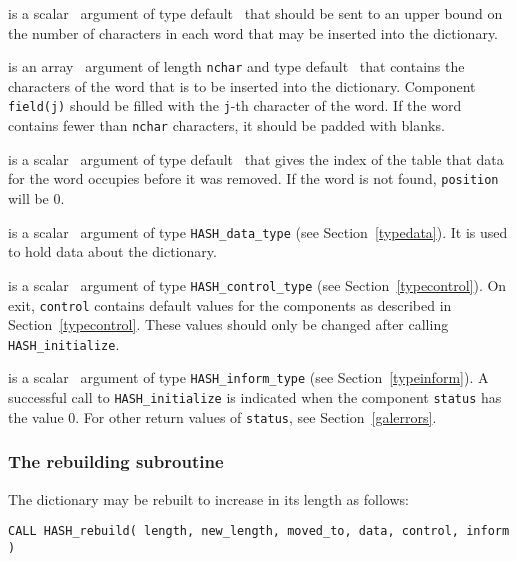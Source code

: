 \documentclass{galahad}
\newcommand{\packagename}{HASH}
\begin{document}
\vspace*{-2mm}
\begin{description}

 is a scalar \intentin\ argument of type default \integer\ that
should be sent to an upper bound on the number of characters in each
word that may be inserted into the dictionary.

 is an array \intentin\ argument of length {\tt nchar} and
type default \character\ that contains the characters of the word that
is to be inserted into the dictionary.
Component {\tt field(j)} should be filled with the {\tt j}-th
character of the word. If the word contains fewer than {\tt nchar} characters,
it should be padded with blanks.

 is a scalar \intentout\ argument of type default \integer\ that
gives the index of the table that data for the word occupies before it was
removed. If the word is not found, {\tt position} will be 0.

 is a scalar \intentinout\ argument of type
{\tt \packagename\_data\_type}
(see Section~\ref{typedata}). It is used to hold data about the dictionary.

 is a scalar \intentin\ argument of type
{\tt \packagename\_control\_type}
(see Section~\ref{typecontrol}).
On exit, {\tt control} contains default values for the components as
described in Section~\ref{typecontrol}.
These values should only be changed after calling
{\tt \packagename\_initialize}.

 is a scalar \intentinout\ argument of type
{\tt \packagename\_inform\_type}
(see Section~\ref{typeinform}). A successful call to
{\tt \packagename\_initialize}
is indicated when the  component {\tt status} has the value 0.
For other return values of {\tt status}, see Section~\ref{galerrors}.

\end{description}


\subsubsection{The rebuilding subroutine}\label{subrebuild}
The dictionary may be rebuilt to increase in its length as follows:
\vspace*{1mm}

\hspace{8mm}
{\tt CALL \packagename\_rebuild( length, new\_length, moved\_to, data, control, inform )}
\end{document}
